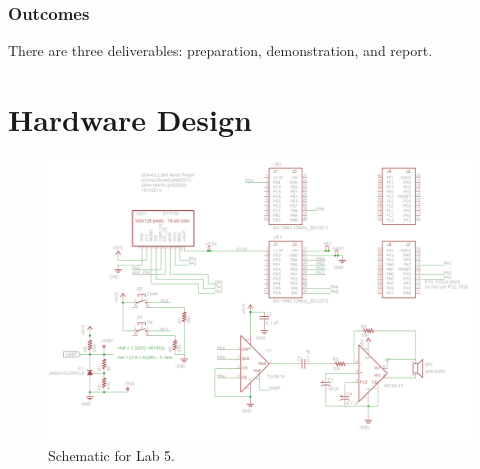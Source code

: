 \documentclass{article}
\begin{document}
		\subsubsection{Outcomes}
			There are three deliverables: preparation, demonstration, and report.

 
\section{Hardware Design}
	\begin{figure}[h]
		\includegraphics[keepaspectratio, width=\textwidth]{Lab5Graphics/FinalSchematic.png}
		\caption{Schematic for Lab 5.}
	\end{figure}

\end{document}
